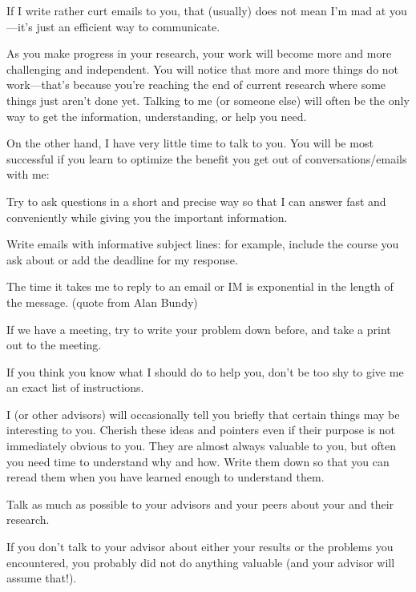 \documentclass[12pt]{article}
\begin{document}
If I write rather curt emails to you, that (usually) does not mean I'm mad at you---it's just an efficient way to communicate.
\medskip

As you make progress in your research, your work will become more and more challenging and independent. You will notice that more and more things do not work---that's because you're reaching the end of current research where some things just aren't done yet. Talking to me (or someone else) will often be the only way to get the information, understanding, or help you need.
\medskip

On the other hand, I have very little time to talk to you. You will be most successful if you learn to optimize the benefit you get out of conversations/emails with me:
\begin{compactitem}
\item Try to ask questions in a short and precise way so that I can answer fast and conveniently while giving you the important information.
\item Write emails with informative subject lines: for example, include the course you ask about or add the deadline for my response.
\item The time it takes me to reply to an email or IM is exponential in the length of the message. (quote from Alan Bundy)
\item If we have a meeting, try to write your problem down before, and take a print out to the meeting.
\item If you think you know what I should do to help you, don't be too shy to give me an exact list of instructions.
\end{compactitem}
\medskip

I (or other advisors) will occasionally tell you briefly that certain things may be interesting to you. Cherish these ideas and pointers even if their purpose is not immediately obvious to you. They are almost always valuable to you, but often you need time to understand why and how.
Write them down so that you can reread them when you have learned enough to understand them.
\medskip

Talk as much as possible to your advisors and your peers about your and their research.

If you don't talk to your advisor about either your results or the problems you encountered, you probably did not do anything valuable (and your advisor will assume that!).
\end{document}
